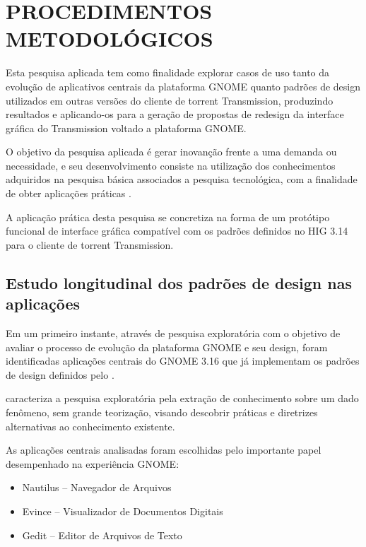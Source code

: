 \chapter{PROCEDIMENTOS METODOLÓGICOS}

Esta pesquisa aplicada tem como finalidade explorar casos de uso tanto da
evolução de aplicativos centrais da plataforma GNOME quanto padrões de design
utilizados em outras versões do cliente de torrent Transmission, produzindo
resultados e aplicando-os para a geração de propostas de redesign da interface
gráfica do Transmission voltado a plataforma GNOME.

O objetivo da pesquisa aplicada é gerar inovanção frente a uma demanda ou
necessidade, e seu desenvolvimento consiste na utilização dos conhecimentos
adquiridos na pesquisa básica associados a pesquisa tecnológica, com a
finalidade de obter aplicações práticas \cite{jung2003metodologia}.

A aplicação prática desta pesquisa se concretiza na forma de um protótipo
funcional de interface gráfica compatível com os padrões definidos no HIG 3.14
para o cliente de torrent Transmission.

\section{Estudo longitudinal dos padrões de design nas aplicações}
\label{sec:chronologic-analysis}

Em um primeiro instante, através de pesquisa exploratória com o objetivo de
avaliar o processo de evolução da plataforma GNOME e seu design, foram
identificadas aplicações centrais do GNOME 3.16 que já implementam os padrões de
design definidos pelo .

 caracteriza a pesquisa exploratória pela
extração de conhecimento sobre um dado fenômeno, sem grande teorização, visando
descobrir práticas e diretrizes alternativas ao conhecimento existente.

As aplicações centrais analisadas foram escolhidas pelo importante papel
desempenhado na experiência GNOME:

\begin{itemize}
    \item Nautilus -- Navegador de Arquivos
    \item Evince -- Visualizador de Documentos Digitais
    \item Gedit -- Editor de Arquivos de Texto
\end{itemize}

